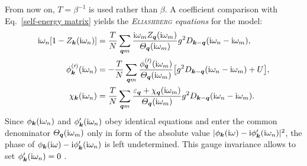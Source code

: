 From now on, $T = \beta^{-1}$ is used rather than $\beta$. A coefficient
comparison with Eq.~\ref{self-energy matrix} yields the
\emph{\textsc{Eliashberg} equations} \cite{Eliashberg60} for the
 model:
%
\begin{subequations}
    \begin{align}
        \mathrm i \omega_n [1 - Z_{\boldsymbol k}(\mathrm i \omega_n)] &= \frac T N
        \sum_{\boldsymbol q m} \frac
            {\mathrm i \omega_m Z_{\boldsymbol q}(\mathrm i \omega_m)}
            {\varTheta_{\boldsymbol q}(\mathrm i \omega_m)}
        g^2 D_{\boldsymbol k - \boldsymbol q}(\mathrm i \omega_n - \mathrm i \omega_m),
        \\
        \phi^{(\prime)}_{\boldsymbol k}(\mathrm i \omega_n) &= -\frac T N
        \sum_{\boldsymbol q m} \frac
            {\phi^{(\prime)}_{\boldsymbol q}(\mathrm i \omega_m)}
            {\varTheta_{\boldsymbol q}(\mathrm i \omega_m)}
        \big[ g^2 D_{\boldsymbol k - \boldsymbol q}(\mathrm i \omega_n - \mathrm i \omega_m) + U \big],
        \\
        \chi_{\boldsymbol k}(\mathrm i \omega_n) &= \frac T N
        \sum_{\boldsymbol q m} \frac
            {\varepsilon_{\boldsymbol q} + \chi_{\boldsymbol q}(\mathrm i \omega_m)}
            {\varTheta_{\boldsymbol q}(\mathrm i \omega_m)}
        g^2 D_{\boldsymbol k - \boldsymbol q}(\mathrm i \omega_n - \mathrm i \omega_m).
    \end{align}
\end{subequations}
%
Since $\phi_{\boldsymbol k}(\mathrm i \omega_n)$ and $\phi'_{\boldsymbol k}(\mathrm i \omega_n)$ obey
identical equations and enter the common denominator $\varTheta_{\boldsymbol q}(\mathrm i
\omega_m)$ only in form of the absolute value $|\phi_{\boldsymbol k}(\mathrm i \omega) - \mathrm i
\phi'_{\boldsymbol k}(\mathrm i \omega_n)|^2$, the phase of $\phi_{\boldsymbol k}(\mathrm i \omega) - \mathrm i
\phi'_{\boldsymbol k}(\mathrm i \omega_n)$ is left undetermined. This gauge invariance allows
to set $\phi'_{\boldsymbol k}(\mathrm i \omega_n) = 0$ \cites[37]{AllenMitrovic82}[around
Eq.~2.20]{Nambu60}.

